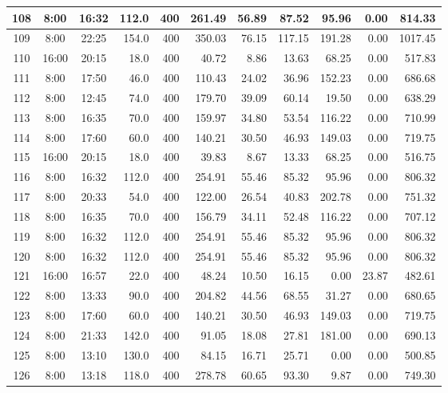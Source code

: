 \begin{landscape}
\begin{longtable}{|c|c|c|r|r|r|r|r|r|r|r|}
\hline
108 & 8:00 & 16:32 & 112.0 & 400 & 261.49 & 56.89 & 87.52 & 95.96 & 0.00 & 814.33 \\
\hline
\rowcolor{gray!8}
109 & 8:00 & 22:25 & 154.0 & 400 & 350.03 & 76.15 & 117.15 & 191.28 & 0.00 & 1017.45 \\
\hline
110 & 16:00 & 20:15 & 18.0 & 400 & 40.72 & 8.86 & 13.63 & 68.25 & 0.00 & 517.83 \\
\hline
\rowcolor{gray!8}
111 & 8:00 & 17:50 & 46.0 & 400 & 110.43 & 24.02 & 36.96 & 152.23 & 0.00 & 686.68 \\
\hline
112 & 8:00 & 12:45 & 74.0 & 400 & 179.70 & 39.09 & 60.14 & 19.50 & 0.00 & 638.29 \\
\hline
\rowcolor{gray!8}
113 & 8:00 & 16:35 & 70.0 & 400 & 159.97 & 34.80 & 53.54 & 116.22 & 0.00 & 710.99 \\
\hline
114 & 8:00 & 17:60 & 60.0 & 400 & 140.21 & 30.50 & 46.93 & 149.03 & 0.00 & 719.75 \\
\hline
\rowcolor{gray!8}
115 & 16:00 & 20:15 & 18.0 & 400 & 39.83 & 8.67 & 13.33 & 68.25 & 0.00 & 516.75 \\
\hline
116 & 8:00 & 16:32 & 112.0 & 400 & 254.91 & 55.46 & 85.32 & 95.96 & 0.00 & 806.32 \\
\hline
\rowcolor{gray!8}
117 & 8:00 & 20:33 & 54.0 & 400 & 122.00 & 26.54 & 40.83 & 202.78 & 0.00 & 751.32 \\
\hline
118 & 8:00 & 16:35 & 70.0 & 400 & 156.79 & 34.11 & 52.48 & 116.22 & 0.00 & 707.12 \\
\hline
\rowcolor{gray!8}
119 & 8:00 & 16:32 & 112.0 & 400 & 254.91 & 55.46 & 85.32 & 95.96 & 0.00 & 806.32 \\
\hline
120 & 8:00 & 16:32 & 112.0 & 400 & 254.91 & 55.46 & 85.32 & 95.96 & 0.00 & 806.32 \\
\hline
\rowcolor{gray!8}
121 & 16:00 & 16:57 & 22.0 & 400 & 48.24 & 10.50 & 16.15 & 0.00 & 23.87 & 482.61 \\
\hline
122 & 8:00 & 13:33 & 90.0 & 400 & 204.82 & 44.56 & 68.55 & 31.27 & 0.00 & 680.65 \\
\hline
\rowcolor{gray!8}
123 & 8:00 & 17:60 & 60.0 & 400 & 140.21 & 30.50 & 46.93 & 149.03 & 0.00 & 719.75 \\
\hline
124 & 8:00 & 21:33 & 142.0 & 400 & 91.05 & 18.08 & 27.81 & 181.00 & 0.00 & 690.13 \\
\hline
\rowcolor{gray!8}
125 & 8:00 & 13:10 & 130.0 & 400 & 84.15 & 16.71 & 25.71 & 0.00 & 0.00 & 500.85 \\
\hline
126 & 8:00 & 13:18 & 118.0 & 400 & 278.78 & 60.65 & 93.30 & 9.87 & 0.00 & 749.30 \\

\end{longtable}
\end{landscape}
